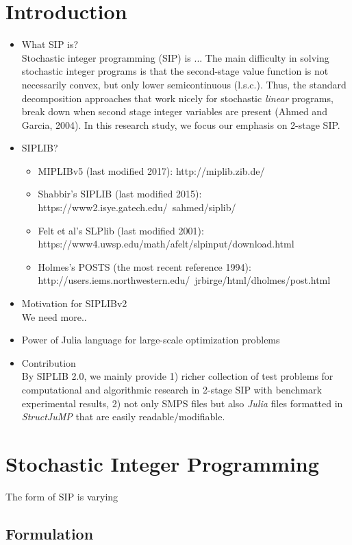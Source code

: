 \section{Introduction}
\begin{itemize}
	\item What SIP is?\\
	Stochastic integer programming (SIP) is ... The main difficulty in solving stochastic integer programs is that the second-stage value function is not necessarily convex, but only lower semicontinuous (l.s.c.). Thus, the standard decomposition approaches that work nicely for stochastic \textit{linear} programs, break down when second stage integer variables are present (Ahmed and Garcia, 2004). In this research study, we focus our emphasis on 2-stage SIP.
	\item SIPLIB?
	\begin{itemize}
		\item MIPLIBv5 (last modified 2017): http://miplib.zib.de/
		\item Shabbir's SIPLIB (last modified 2015): https://www2.isye.gatech.edu/~sahmed/siplib/
		\item Felt et al's SLPlib (last modified 2001): https://www4.uwsp.edu/math/afelt/slpinput/download.html
		\item Holmes's POSTS (the most recent reference 1994): http://users.iems.northwestern.edu/~jrbirge/html/dholmes/post.html
	\end{itemize}
	\item Motivation for SIPLIBv2\\
	We need more..
	\item Power of Julia language for large-scale optimization problems
	\item Contribution\\
	By SIPLIB 2.0, we mainly provide 1) richer collection of test problems for computational and algorithmic research in 2-stage SIP with benchmark experimental results, 2) not only SMPS files but also \textit{Julia} files formatted in \textit{StructJuMP} that are easily readable/modifiable.
\end{itemize}


\section{Stochastic Integer Programming}
The form of SIP is varying 
\subsection{Formulation}
